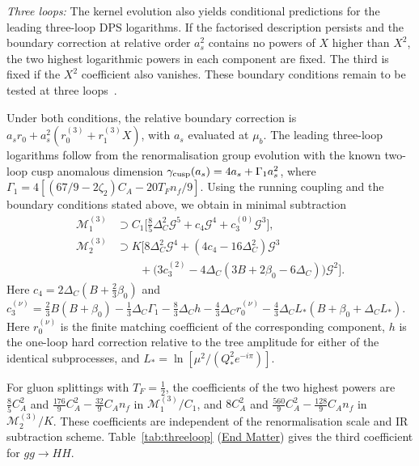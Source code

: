 \documentclass[%
 twocolumn,
 superscriptaddress,
 preprintnumbers,
 nofootinbib,
 amsmath,amssymb,
 aps,
 prl,
]{revtex4-2}
\newcommand{\G}{\mathcal G}
\newcommand{\M}{\mathcal M}
\newcommand{\DD}{\Delta_C}
\begin{document}
\textit{Three loops:}
The kernel evolution also yields conditional predictions
for the leading three-loop DPS logarithms. If the
factorised description persists and the boundary
correction at relative order $a_s^2$ contains no
powers of $X$ higher than $X^2$, the two highest
logarithmic powers in each component are fixed.
The third is fixed if the $X^2$ coefficient also
vanishes. These boundary conditions remain to be
tested at three loops~\cite{SM}.

Under both conditions, the relative boundary correction
is $a_sr_0+a_s^2(r_0^{(3)}+r_1^{(3)}X)$, with $a_s$
evaluated at $\mu_b$.
The leading three-loop logarithms follow from the
renormalisation group evolution with the known
two-loop cusp anomalous dimension
$\gamma_{\rm cusp}(a_s)=4a_s+\Gamma_1a_s^2$,
where
$\Gamma_1=4[(67/9-2\zeta_2)C_A-20T_Fn_f/9]$.
Using the running coupling and the boundary
conditions stated above, we obtain in
minimal subtraction
\begin{equation}
\begin{aligned}
\M_1^{(3)}&\supset C_1\Big[\tfrac85\DD^2\G^5+c_4\G^4+c_3^{(0)}\G^3\Big],\\
\M_2^{(3)}&\supset K\Big[8\DD^2\G^4+(4c_4-16\DD^2)\G^3\\
&\qquad+\big(3c_3^{(2)}-4\DD(3B+2\beta_0-6\DD)\big)\G^2\Big].
\end{aligned}
\label{eq:threeloop}
\end{equation}
Here
$c_4=2\DD(B+\frac23\beta_0)$ and
$c_3^{(\nu)}=\frac23B(B+\beta_0)-\frac13\DD\Gamma_1-\frac83\DD h-\frac43\DD r_0^{(\nu)}-\frac43\DD L_*(B+\beta_0+\DD L_*)$.
Here $r_0^{(\nu)}$ is the finite matching coefficient
of the corresponding component, $h$ is the one-loop
hard correction relative to the tree amplitude
for either of the identical subprocesses, and
$L_*=\ln[\mu^2/(Q_*^2e^{-i\pi})]$.

For gluon splittings with $T_F=\frac12$, the
coefficients of the two highest powers are
$\frac85C_A^2$ and
$\frac{176}9C_A^2-\frac{32}9C_An_f$
in $\M_1^{(3)}/C_1$, and $8C_A^2$ and
$\frac{560}9C_A^2-\frac{128}9C_An_f$
in $\M_2^{(3)}/K$.
These coefficients are independent of the
renormalisation scale and IR subtraction
scheme. Table~\ref{tab:threeloop}
(\hyperref[sec:endmatter]{End Matter})
gives the third coefficient for $gg\to HH$.
\end{document}
